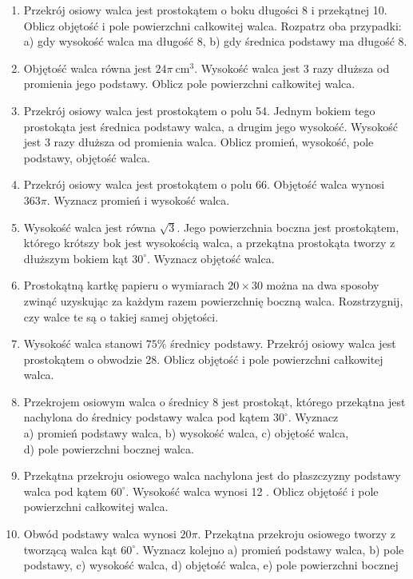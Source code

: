 \documentclass[10pt]{article}
\begin{document}
\begin{enumerate}
  \item Przekrój osiowy walca jest prostokątem o boku długości 8 i przekątnej 10. Oblicz objętość i pole powierzchni całkowitej walca. Rozpatrz oba przypadki: a) gdy wysokość walca ma długość 8, b) gdy średnica podstawy ma długość 8.
  \item Objętość walca równa jest \(24 \pi \mathrm{~cm}^{3}\). Wysokość walca jest 3 razy dłuższa od promienia jego podstawy. Oblicz pole powierzchni całkowitej walca.
  \item Przekrój osiowy walca jest prostokątem o polu 54. Jednym bokiem tego prostokąta jest średnica podstawy walca, a drugim jego wysokość. Wysokość jest 3 razy dłuższa od promienia walca. Oblicz promień, wysokość, pole podstawy, objętość walca.
  \item Przekrój osiowy walca jest prostokątem o polu 66. Objętość walca wynosi \(363 \pi\). Wyznacz promień i wysokość walca.
  \item Wysokość walca jest równa \(\sqrt{3}\). Jego powierzchnia boczna jest prostokątem, którego krótszy bok jest wysokością walca, a przekątna prostokąta tworzy z dłuższym bokiem kąt \(30^{\circ}\). Wyznacz objętość walca.
  \item Prostokątną kartkę papieru o wymiarach \(20 \times 30\) można na dwa sposoby zwinąć uzyskując za każdym razem powierzchnię boczną walca. Rozstrzygnij, czy walce te są o takiej samej objętości.
  \item Wysokość walca stanowi \(75 \%\) średnicy podstawy. Przekrój osiowy walca jest prostokątem o obwodzie 28. Oblicz objętość i pole powierzchni całkowitej walca.
  \item Przekrojem osiowym walca o średnicy 8 jest prostokąt, którego przekątna jest nachylona do średnicy podstawy walca pod kątem \(30^{\circ}\). Wyznacz\\
a) promień podstawy walca, b) wysokość walca, c) objętość walca,\\
d) pole powierzchni bocznej walca.
  \item Przekątna przekroju osiowego walca nachylona jest do płaszczyzny podstawy walca pod kątem \(60^{\circ}\). Wysokość walca wynosi 12 . Oblicz objętość i pole powierzchni całkowitej walca.
  \item Obwód podstawy walca wynosi \(20 \pi\). Przekątna przekroju osiowego tworzy z tworzącą walca kąt \(60^{\circ}\). Wyznacz kolejno a) promień podstawy walca, b) pole podstawy, c) wysokość walca, d) objętość walca, e) pole powierzchni bocznej
\end{enumerate}
\end{document}
